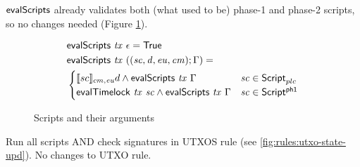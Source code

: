 $\mathsf{evalScripts}$ already validates both (what used to be) phase-1 and phase-2 scripts, so
no changes needed (Figure \ref{fig:functions:script2}).

\begin{figure}[htb]
  \begin{align*}
    & \mathsf{evalScripts}~\mathit{tx}~\epsilon = \mathsf{True} \\
    & \mathsf{evalScripts}~\mathit{tx}~((\mathit{sc}, \mathit{d}, \mathit{eu}, \mathit{cm});\Gamma) = \\
      & \begin{cases}
        \llbracket sc \rrbracket_{cm,\mathit{eu}} d \land \mathsf{evalScripts}~\mathit{tx}~\Gamma & \mathit{sc}\in\mathsf{Script}_{plc} \\
        \mathsf{evalTimelock}~\mathit{tx}~\mathit{sc} \land \mathsf{evalScripts}~\mathit{tx}~\Gamma & \mathit{sc}\in\mathsf{Script^{ph1}}
      \end{cases}
  \end{align*}
  \caption{Scripts and their arguments}
  \label{fig:functions:script2}
\end{figure}


Run all scripts AND check signatures in UTXOS rule
(see \ref{fig:rules:utxo-state-upd}). No changes to UTXO rule.

